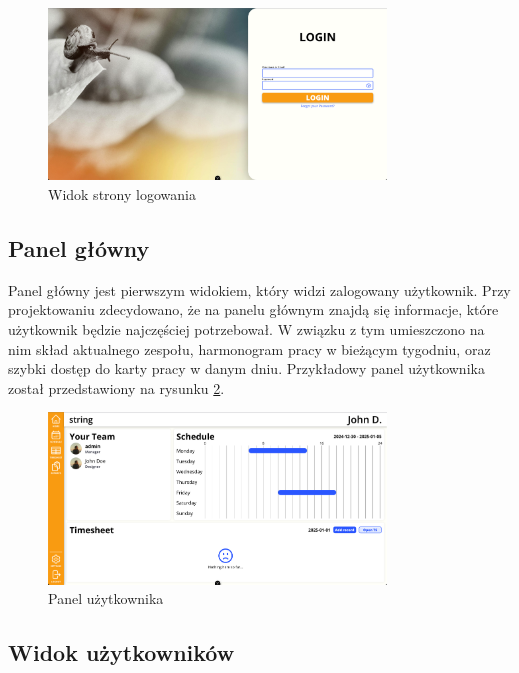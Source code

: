 \begin{figure}[H]
    \centering
    \includegraphics[width=0.8\textwidth, frame]{graf/front/loginPage.png}
    \caption{Widok strony logowania}
    \label{fig:loginPage}
\end{figure}

\subsection{Panel główny}

Panel główny jest pierwszym widokiem, który widzi zalogowany użytkownik. Przy projektowaniu zdecydowano, że na panelu głównym znajdą się informacje, które użytkownik będzie najczęściej potrzebował. W związku z tym umieszczono na nim skład aktualnego zespołu, harmonogram pracy w bieżącym tygodniu, oraz szybki dostęp do karty pracy w danym dniu. Przykładowy panel użytkownika został przedstawiony na rysunku \ref{fig:userDashboard}.

\begin{figure}[H]
    \centering
    \includegraphics[width=0.8\textwidth, frame]{graf/userDashboard.png}
    \caption{Panel użytkownika}
    \label{fig:userDashboard}
\end{figure}

\subsection{Widok użytkowników}

